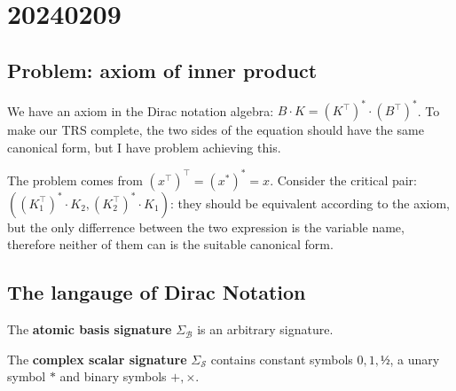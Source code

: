 \chapter{20240209}

\renewcommand*{\unit}{\texttt{unit}}
\renewcommand*{\utt}{\texttt{tt}}
\renewcommand*{\fst}{\texttt{fst}}
\renewcommand*{\snd}{\texttt{snd}}
\renewcommand*{\reduce}{\ \triangleright\ }
\renewcommand*{\reducefrom}{\ \triangleleft\ }

\renewcommand*{\zeroK}[1]{\mathbf{0}_{\mathcal{K}(#1)}}
\renewcommand*{\zeroB}[1]{\mathbf{0}_{\mathcal{B}(#1)}}
\renewcommand*{\zeroO}[1]{\mathbf{0}_{\mathcal{O}(#1)}}


\section{Problem: axiom of inner product}
We have an axiom in the Dirac notation algebra: $B \cdot K = (K^\top)^* \cdot (B^\top)^*$. To make our TRS complete, the two sides of the equation should have the same canonical form, but I have problem achieving this.

The problem comes from $(x^\top)^\top = (x^*)^* = x$. Consider the critical pair: $((K_1^\top)^* \cdot K_2, (K_2^\top)^* \cdot K_1)$: they should be equivalent according to the axiom, but the only differrence between the two expression is the variable name, therefore neither of them can is the suitable canonical form.



\section{The langauge of Dirac Notation}

\begin{definition} 
  The \textbf{atomic basis signature} $\Sigma_\mathcal{B}$ is an arbitrary signature.
\end{definition}

\begin{definition} 
  The \textbf{complex scalar signature} $\Sigma_\mathcal{S}$ contains constant symbols $0, 1, \text{½}$, a unary symbol $*$ and binary symbols $+, \times$.
\end{definition}

